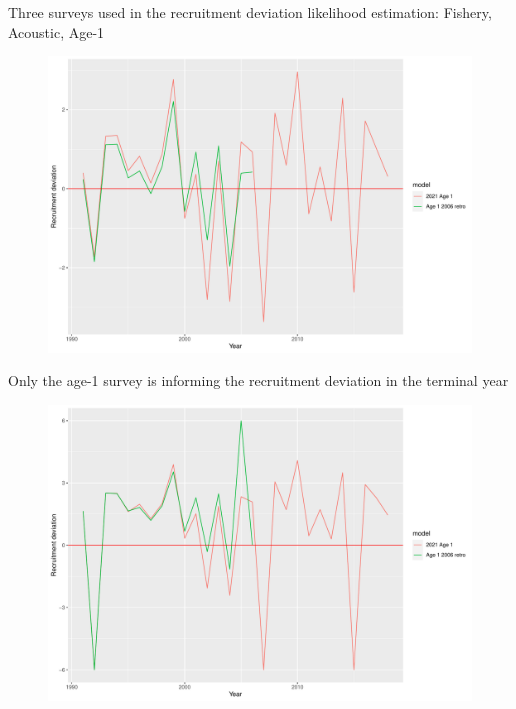 \documentclass[
  ignorenonframetext,
]{beamer}
\begin{document}
\begin{frame}
Three surveys used in the recruitment deviation likelihood estimation:
Fishery, Acoustic, Age-1

\begin{figure}

{\centering \includegraphics{presentation_files/figure-beamer/unnamed-chunk-4-1.pdf}

}

\end{figure}
\end{frame}

\begin{frame}
Only the age-1 survey is informing the recruitment deviation in the
terminal year

\begin{figure}

{\centering \includegraphics{presentation_files/figure-beamer/unnamed-chunk-5-1.pdf}

}

\end{figure}
\end{frame}
\end{document}
